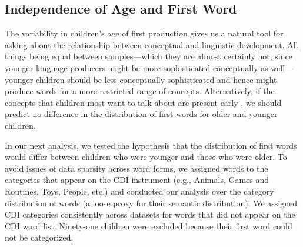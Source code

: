 \documentclass[10pt,letterpaper]{article}
\begin{document}


\subsection{Independence of Age and First Word}

The variability in children's age of first production gives us a natural tool for asking about the relationship between conceptual and linguistic development. All things being equal between samples---which they are almost certainly not, since younger language producers might be more sophisticated conceptually as well---younger children should be less conceptually sophisticated and hence might produce words for a more restricted range of concepts. Alternatively, if the concepts that children most want to talk about are present early \cite{snedeker2007,snedeker2012,gleitman1990}, we should predict no difference in the distribution of first words for older and younger children. 


In our next analysis, we tested the hypothesis that the distribution of first words would differ between children who were younger and those who were older. To avoid issues of data sparsity across word forms, we assigned words to the categories that appear on the CDI instrument (e.g., Animals, Games and Routines, Toys, People, etc.) and conducted our analysis over the category distribution of words (a loose proxy for their semantic distribution). We assigned CDI categories consistently across datasets for words that did not appear on the CDI word list. Ninety-one children were excluded because their first word could not be categorized. 
\end{document}
